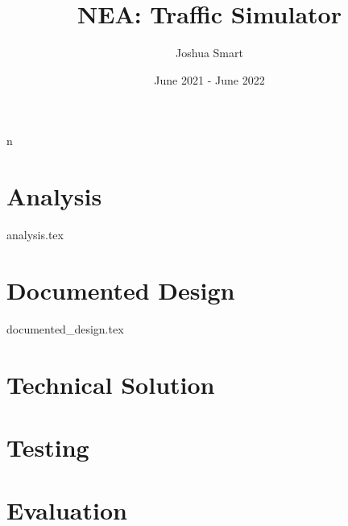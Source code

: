 \documentclass{report}
\title{NEA: Traffic Simulator}
\author{Joshua Smart}
\date{June 2021 - June 2022}
\begin{document}
    \begin{titlepage}
        \maketitle
    \end{titlepage}n

    \tableofcontents

    \setparagraphstyling
    \chapter{Analysis}
        {analysis.tex}

    \chapter{Documented Design}
        {documented_design.tex}

    \chapter{Technical Solution}

    \chapter{Testing}

    \chapter{Evaluation}

    \printbibliography
\end{document}
